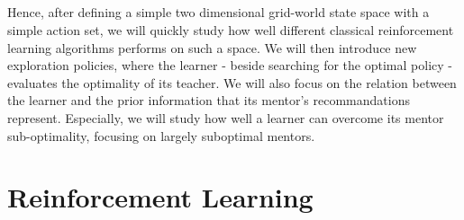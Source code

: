 \documentclass[a4paper]{report}
\begin{document}
{{			\paragraph{} Hence, after defining a simple two dimensional grid-world state space with a simple action set, we will quickly study how well different classical reinforcement learning algorithms performs on such a space. We will then introduce new exploration policies, where the learner - beside searching for the optimal policy - evaluates the optimality of its teacher. We will also focus on the relation between the learner and the prior information that its mentor's recommandations represent. Especially, we will study how well a learner can overcome its mentor sub-optimality, focusing on largely suboptimal mentors. 
		}
	}
	\newpage
	
	\chapter{Reinforcement Learning}
\end{document}
